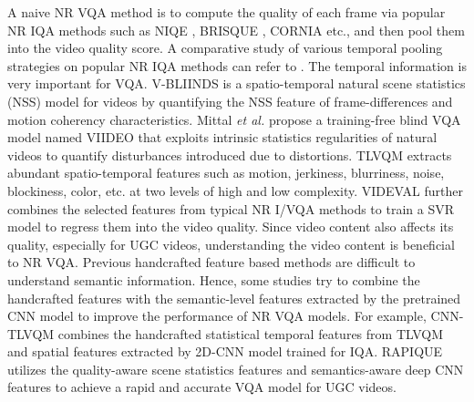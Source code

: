 \documentclass[sigconf]{acmart}
\begin{document}
A naive NR VQA method is to compute the quality of each frame via popular NR IQA methods such as NIQE \cite{mittal2012making}, BRISQUE \cite{mittal2012no}, CORNIA \cite{ye2012unsupervised} etc., and then pool them into the video quality score. A comparative study of various temporal pooling strategies on popular NR IQA methods can refer to \cite{tu2020comparative}. The temporal information is very important for VQA. V-BLIINDS \cite{saad2014blind} is a spatio-temporal natural scene statistics (NSS) model for videos by quantifying the NSS feature of frame-differences and motion coherency characteristics. 
Mittal \textit{et al.} \cite{mittal2015completely} propose a training-free blind VQA model named VIIDEO that exploits intrinsic statistics regularities of natural videos to quantify disturbances introduced due to distortions. 
TLVQM \cite{korhonen2019two} extracts abundant spatio-temporal features such as motion, jerkiness, blurriness, noise, blockiness, color, etc. at two levels of high and low complexity. VIDEVAL \cite{tu2021ugc} further combines the selected features from typical NR I/VQA methods to train a SVR model to regress them into the video quality. Since video content also affects its quality, especially for UGC videos, understanding the video content is beneficial to NR VQA. Previous handcrafted feature based methods are difficult to understand semantic information. Hence, some studies \cite{tu2021rapique, korhonen2020blind} try to combine the handcrafted features with the semantic-level features extracted by the pretrained CNN model to improve the performance of NR VQA models. For example, CNN-TLVQM \cite{korhonen2020blind} combines the handcrafted statistical temporal features from TLVQM and spatial features extracted by 2D-CNN model trained for IQA. RAPIQUE \cite{tu2021rapique} utilizes the quality-aware scene statistics features and semantics-aware deep CNN features to achieve a rapid and accurate VQA model for UGC videos.
\end{document}
